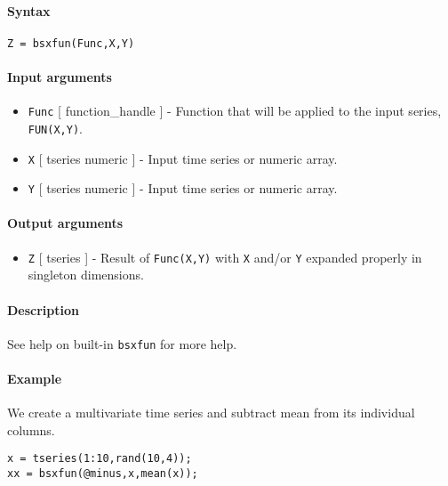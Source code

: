


	\paragraph{Syntax}\label{syntax}

\begin{verbatim}
Z = bsxfun(Func,X,Y)
\end{verbatim}

\paragraph{Input arguments}\label{input-arguments}

\begin{itemize}
\item
  \texttt{Func} {[} function\_handle {]} - Function that will be applied
  to the input series, \texttt{FUN(X,Y)}.
\item
  \texttt{X} {[} tseries \textbar{} numeric {]} - Input time series or
  numeric array.
\item
  \texttt{Y} {[} tseries \textbar{} numeric {]} - Input time series or
  numeric array.
\end{itemize}

\paragraph{Output arguments}\label{output-arguments}

\begin{itemize}
\itemsep1pt\parskip0pt
\item
  \texttt{Z} {[} tseries {]} - Result of \texttt{Func(X,Y)} with
  \texttt{X} and/or \texttt{Y} expanded properly in singleton
  dimensions.
\end{itemize}

\paragraph{Description}\label{description}

See help on built-in \texttt{bsxfun} for more help.

\paragraph{Example}\label{example}

We create a multivariate time series and subtract mean from its
individual columns.

\begin{verbatim}
x = tseries(1:10,rand(10,4));
xx = bsxfun(@minus,x,mean(x));
\end{verbatim}


